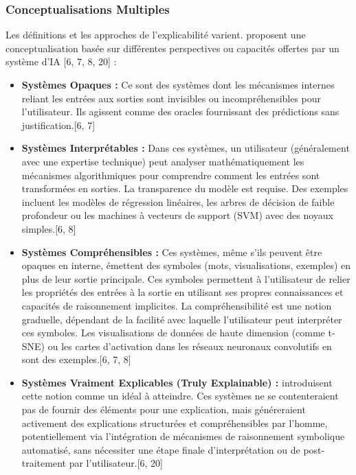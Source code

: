 \documentclass[11pt,a4paper]{article}
\begin{document}
\subsubsection{Conceptualisations Multiples}
Les définitions et les approches de l'explicabilité varient. \citet{Doran2017} proposent une conceptualisation basée sur différentes perspectives ou capacités offertes par un système d'IA [6, 7, 8, 20] :
\begin{itemize}
    \item \textbf{Systèmes Opaques :} Ce sont des systèmes dont les mécanismes internes reliant les entrées aux sorties sont invisibles ou incompréhensibles pour l'utilisateur. Ils agissent comme des oracles fournissant des prédictions sans justification.[6, 7]
    \item \textbf{Systèmes Interprétables :} Dans ces systèmes, un utilisateur (généralement avec une expertise technique) peut analyser mathématiquement les mécanismes algorithmiques pour comprendre comment les entrées sont transformées en sorties. La transparence du modèle est requise. Des exemples incluent les modèles de régression linéaires, les arbres de décision de faible profondeur ou les machines à vecteurs de support (SVM) avec des noyaux simples.[6, 8]
    \item \textbf{Systèmes Compréhensibles :} Ces systèmes, même s'ils peuvent être opaques en interne, émettent des symboles (mots, visualisations, exemples) en plus de leur sortie principale. Ces symboles permettent à l'utilisateur de relier les propriétés des entrées à la sortie en utilisant ses propres connaissances et capacités de raisonnement implicites. La compréhensibilité est une notion graduelle, dépendant de la facilité avec laquelle l'utilisateur peut interpréter ces symboles. Les visualisations de données de haute dimension (comme t-SNE) ou les cartes d'activation dans les réseaux neuronaux convolutifs en sont des exemples.[6, 7, 8]
    \item \textbf{Systèmes Vraiment Explicables (Truly Explainable) :} \citet{Doran2017} introduisent cette notion comme un idéal à atteindre. Ces systèmes ne se contenteraient pas de fournir des éléments pour une explication, mais généreraient activement des explications structurées et compréhensibles par l'homme, potentiellement via l'intégration de mécanismes de raisonnement symbolique automatisé, sans nécessiter une étape finale d'interprétation ou de post-traitement par l'utilisateur.[6, 20]
\end{itemize}
\end{document}
